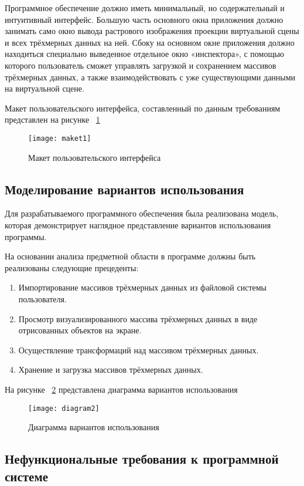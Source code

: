 Программное обеспечение должно иметь минимальный, но содержательный и интуитивный интерфейс. Большую часть основного окна приложения должно занимать само окно вывода растрового изображения проекции виртуальной сцены и всех трёхмерных данных на ней. Сбоку на основном окне приложения должно находиться специально выведенное отдельное окно «инспектора», с помощью которого пользователь сможет управлять загрузкой и сохранением массивов трёхмерных данных, а также взаимодействовать с уже существующими данными на виртуальной сцене.

Макет пользовательского интерфейса, составленный по данным требованиям представлен на рисунке ~\ref{maket1:image}

\begin{figure}[ht]
	\texttt{[image: maket1]}
	\caption{Макет пользовательского интерфейса}
	\label{maket1:image}
\end{figure}

\subsection{Моделирование вариантов использования}

Для разрабатываемого программного обеспечения была реализована модель, которая демонстрирует наглядное представление вариантов использования программы.

На основании анализа предметной области в программе должны быть реализованы следующие прецеденты:
\begin{enumerate}
\item Импортирование массивов трёхмерных данных из файловой системы пользователя.
\item Просмотр визуализированного массива трёхмерных данных в виде отрисованных объектов на экране.
\item Осуществление трансформаций над массивом трёхмерных данных.
\item Хранение и загрузка массивов трёхмерных данных.
\end{enumerate}

На рисунке ~\ref{diagram2:image} представлена диаграмма вариантов использования

\begin{figure}[H]
	\texttt{[image: diagram2]}
	\caption{Диаграмма вариантов использования}
	\label{diagram2:image}
\end{figure}

\subsection{Нефункциональные требования к программной системе}

